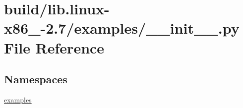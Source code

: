 \hypertarget{build_2lib_8linux-x86__64-2_87_2examples_2____init_____8py}{}\section{build/lib.linux-\/x86\+\_-\/2.7/examples/\+\_\+\+\_\+init\+\_\+\+\_\+.py File Reference}
\label{build_2lib_8linux-x86__64-2_87_2examples_2____init_____8py}
\subsection*{Namespaces}
\begin{DoxyCompactItemize}
\item 
 \hyperlink{namespaceexamples}{examples}
\end{DoxyCompactItemize}
